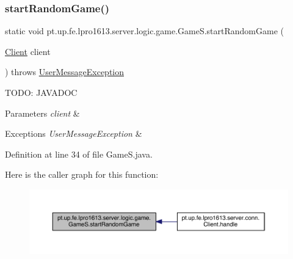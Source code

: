 \subsubsection{\texorpdfstring{start\+Random\+Game()}{startRandomGame()}}
{\footnotesize\ttfamily static void pt.\+up.\+fe.\+lpro1613.\+server.\+logic.\+game.\+Game\+S.\+start\+Random\+Game (\begin{DoxyParamCaption}\item[{\hyperlink{classpt_1_1up_1_1fe_1_1lpro1613_1_1server_1_1conn_1_1_client}{Client}}]{client }\end{DoxyParamCaption}) throws \hyperlink{classpt_1_1up_1_1fe_1_1lpro1613_1_1sharedlib_1_1exceptions_1_1_user_message_exception}{User\+Message\+Exception}\hspace{0.3cm}{\ttfamily [static]}}

T\+O\+DO\+: J\+A\+V\+A\+D\+OC 
\begin{DoxyParams}{Parameters}
{\em client} & \\
\hline
\end{DoxyParams}

\begin{DoxyExceptions}{Exceptions}
{\em User\+Message\+Exception} & \\
\hline
\end{DoxyExceptions}


Definition at line 34 of file Game\+S.\+java.

Here is the caller graph for this function\+:
\nopagebreak
\begin{figure}[H]
\begin{center}
\leavevmode
\includegraphics[width=350pt]{classpt_1_1up_1_1fe_1_1lpro1613_1_1server_1_1logic_1_1game_1_1_game_s_ad185482b31f44a23e868605f9cc49d09_icgraph}
\end{center}
\end{figure}
\hypertarget{classpt_1_1up_1_1fe_1_1lpro1613_1_1server_1_1logic_1_1game_1_1_game_s_af95663046473b1a2aceebf4fd27906a2}{}\label{classpt_1_1up_1_1fe_1_1lpro1613_1_1server_1_1logic_1_1game_1_1_game_s_af95663046473b1a2aceebf4fd27906a2} 

